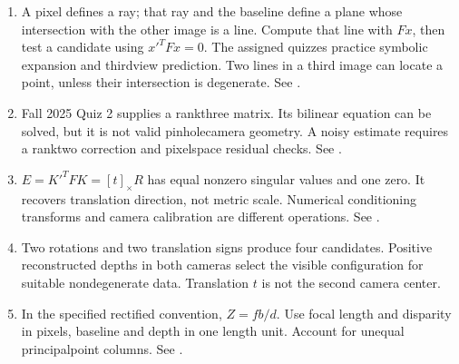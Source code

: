 \documentclass[letterpaper,11pt,english,openany,oneside]{jupyterBook}
\begin{document}
\label{\detokenize{lectures/lecture04/tldr:the-important-things}}\begin{enumerate}
%
\item {}
\sphinxAtStartPar
{} A pixel defines a ray; that ray and the baseline define a plane whose intersection with the other image is a line. Compute that line with \(Fx\), then test a candidate using \(x'^TFx=0\). The assigned quizzes practice symbolic expansion and third\sphinxhyphen{}view prediction. Two lines in a third image can locate a point, unless their intersection is degenerate. See {\hyperref[\detokenize{lectures/lecture04/epipolar-practice::doc}]{}}.

\item {}
\sphinxAtStartPar
{} Fall 2025 Quiz 2 supplies a rank\sphinxhyphen{}three matrix. Its bilinear equation can be solved, but it is not valid pinhole\sphinxhyphen{}camera geometry. A noisy estimate requires a rank\sphinxhyphen{}two correction and pixel\sphinxhyphen{}space residual checks. See {\hyperref[\detokenize{lectures/lecture04/estimation::doc}]{}}.

\item {}
\sphinxAtStartPar
{} \(E=K'^TFK=[t]_\times R\) has equal nonzero singular values and one zero. It recovers translation direction, not metric scale. Numerical conditioning transforms and camera calibration are different operations. See {\hyperref[\detokenize{lectures/lecture04/essential::doc}]{}}.

\item {}
\sphinxAtStartPar
{} Two rotations and two translation signs produce four candidates. Positive reconstructed depths in both cameras select the visible configuration for suitable nondegenerate data. Translation \(t\) is not the second camera center.

\item {}
\sphinxAtStartPar
{} In the specified rectified convention, \(Z=fb/d\). Use focal length and disparity in pixels, baseline and depth in one length unit. Account for unequal principal\sphinxhyphen{}point columns. See {\hyperref[\detokenize{lectures/lecture04/stereo::doc}]{}}.


\end{enumerate}
\end{document}
